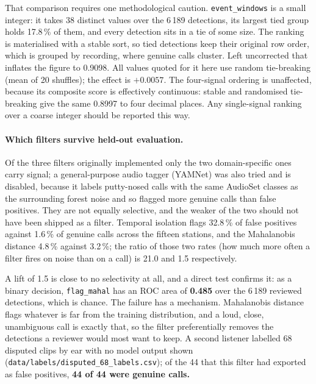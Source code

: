 \documentclass[review,3p,times]{elsarticle}
\begin{document}
That comparison requires one methodological caution. \texttt{event\_windows} is
a small integer: it takes 38 distinct values over the 6\,189 detections, its
largest tied group holds 17.8\,\% of them, and every detection sits in a tie of
some size. The ranking is materialised with a stable sort, so tied detections
keep their original row order, which is grouped by recording, where genuine
calls cluster. Left uncorrected that inflates the figure to 0.9098. All values
quoted for it here use random tie-breaking (mean of 20 shuffles); the effect is
$+0.0057$. The four-signal ordering is unaffected, because its composite score
is effectively continuous: stable and randomised tie-breaking give the same
0.8997 to four decimal places. Any single-signal ranking over a coarse integer
should be reported this way.

\paragraph{Which filters survive held-out evaluation.}
Of the three filters originally implemented only the two domain-specific ones
carry signal; a general-purpose audio tagger (YAMNet) was also tried and is
disabled, because it labels putty-nosed calls with the same AudioSet classes as
the surrounding forest noise and so flagged more genuine calls than false
positives.
They are not equally selective, and the weaker of the two should not have been
shipped as a filter. Temporal isolation flags 32.8\,\% of false positives
against 1.6\,\% of genuine calls across the fifteen stations, and the
Mahalanobis distance 4.8\,\% against 3.2\,\%; the ratio of those two rates
(how much more often a filter fires on noise than on a call) is 21.0 and 1.5
respectively.

A lift of 1.5 is close to no selectivity at all, and a direct test confirms it:
as a binary decision, \texttt{flag\_mahal} has an ROC area of \textbf{0.485}
over the 6\,189 reviewed detections, which is chance. The failure has a
mechanism. Mahalanobis distance flags whatever is far from the training
distribution, and a loud, close, unambiguous call is exactly that, so the
filter preferentially removes the detections a reviewer would most want to keep.
A second listener labelled 68 disputed clips by ear with no model output shown
(\texttt{data/labels/disputed\_68\_labels.csv}); of the 44 that this filter had
exported as false positives, \textbf{44 of 44 were genuine calls.}
\end{document}
